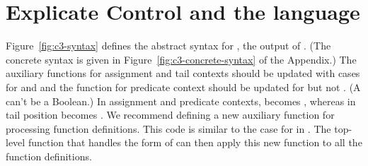 \documentclass[11pt]{book}
\begin{document}
\section{Explicate Control and the \LangCFun{} language}
\label{sec:explicate-control-r4}

Figure~\ref{fig:c3-syntax} defines the abstract syntax for \LangCFun{}, the
output of . (The concrete syntax is given in
Figure~\ref{fig:c3-concrete-syntax} of the Appendix.) The auxiliary
functions for assignment and tail contexts should be updated with
cases for  and  and the function for
predicate context should be updated for  but not
.  (A  can't be a Boolean.)  In assignment
and predicate contexts,  becomes , whereas in
tail position  becomes .  We recommend
defining a new auxiliary function for processing function definitions.
This code is similar to the case for  in \LangVec{}.  The
top-level  function that handles the
 form of \LangFun{} can then apply this new function to
all the function definitions.
\end{document}
